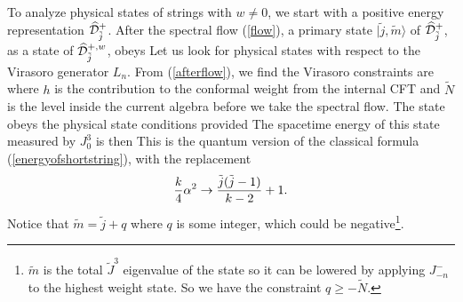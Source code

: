 To analyze physical states of strings with $w\neq 0$,
we start with a positive energy representation 
$\widehat {\cal D}_{\tilde{j}}^+$.
After the spectral flow (\ref{flow}), a primary state
$|\tilde{j}, \tilde{m}\rangle$ of $\widehat {\cal D}_{\tilde{j}}^+$,
as a state of $\widehat {\cal D}^{+,w}_{\tilde j}$,  obeys 
Let us look for physical states with respect to the Virasoro
generator $L_n$. From (\ref{afterflow}), we find
the Virasoro constraints are
where $h$ is the contribution to the conformal weight from the internal 
CFT and $\tilde{N}$ is the level inside the current algebra
before we take the spectral flow. 
The state  obeys the physical state
conditions provided
The spacetime energy of this state measured by $J_0^3$ is then
This is the quantum version of the classical formula
(\ref{energyofshortstring}), with the replacement
$${k \over 4} \alpha^2 \rightarrow {\tilde{j}(\tilde{j}-1) \over k-2} 
+ 1.$$ 
Notice that $\tilde m = \tilde j +q$ where $q$ is some integer, which could
be negative\footnote{$\tilde m$ is the total $\tilde J^3$ eigenvalue of the 
state so it can be lowered by applying $J^-_{-n} $ to the highest weight
state. So we have the constraint $q \geq -\tilde{N}$.}.
